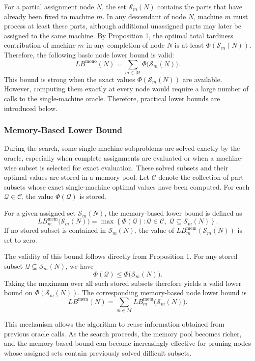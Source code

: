 \documentclass[review,3p,times,authoryear]{elsarticle}
\begin{document}
For a partial assignment node $N$, the set $\mathcal{S}_m(N)$ contains the
parts that have already been fixed to machine $m$. In any descendant of
node $N$, machine $m$ must process at least these parts, although additional
unassigned parts may later be assigned to the same machine. By Proposition
1, the optimal total tardiness contribution of machine $m$ in any completion
of node $N$ is at least $\Phi(\mathcal{S}_m(N))$. Therefore, the following
basic node lower bound is valid:
\[
LB^{\mathrm{mono}}(N)
=
\sum_{m\in\mathcal{M}}
\Phi\bigl(\mathcal{S}_m(N)\bigr).
\]
This bound is strong when the exact values
$\Phi(\mathcal{S}_m(N))$ are available. However, computing them exactly at
every node would require a large number of calls to the single-machine
oracle. Therefore, practical lower bounds are introduced below.

\subsubsection{Memory-Based Lower Bound}

During the search, some single-machine subproblems are solved exactly by
the oracle, especially when complete assignments are evaluated or when a
machine-wise subset is selected for exact evaluation. These solved subsets
and their optimal values are stored in a memory pool. Let $\mathcal{C}$
denote the collection of part subsets whose exact single-machine optimal
values have been computed. For each $\mathcal{Q}\in\mathcal{C}$, the value
$\Phi(\mathcal{Q})$ is stored.

For a given assigned set $\mathcal{S}_m(N)$, the memory-based lower bound is
defined as
\[
LB_m^{\mathrm{mem}}\bigl(\mathcal{S}_m(N)\bigr)
=
\max
\left\{
\Phi(\mathcal{Q}) :
\mathcal{Q}\in\mathcal{C},
\;
\mathcal{Q}\subseteq \mathcal{S}_m(N)
\right\}.
\]
If no stored subset is contained in $\mathcal{S}_m(N)$, the value of
$LB_m^{\mathrm{mem}}(\mathcal{S}_m(N))$ is set to zero.

The validity of this bound follows directly from Proposition 1. For any
stored subset $\mathcal{Q}\subseteq \mathcal{S}_m(N)$, we have
\[
\Phi(\mathcal{Q})
\le
\Phi\bigl(\mathcal{S}_m(N)\bigr).
\]
Taking the maximum over all such stored subsets therefore yields a valid
lower bound on $\Phi(\mathcal{S}_m(N))$. The corresponding memory-based
node lower bound is
\[
LB^{\mathrm{mem}}(N)
=
\sum_{m\in\mathcal{M}}
LB_m^{\mathrm{mem}}\bigl(\mathcal{S}_m(N)\bigr).
\]

This mechanism allows the algorithm to reuse information obtained from
previous oracle calls. As the search proceeds, the memory pool becomes
richer, and the memory-based bound can become increasingly effective for
pruning nodes whose assigned sets contain previously solved difficult
subsets.
\end{document}
